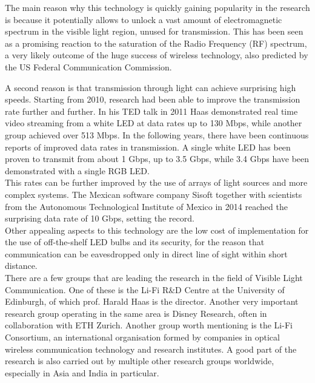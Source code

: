 The main reason why this technology is quickly gaining popularity in the research is because it potentially allows to unlock a vast amount of electromagnetic spectrum in the visible light region, unused for transmission.\cite{haas1}
This has been seen as a promising reaction to the saturation of the Radio Frequency (RF) spectrum, a very likely outcome of the huge success of wireless technology, also predicted by the US Federal Communication Commission\cite{crisis}. 

A second reason is that transmission through light can achieve surprising high speeds.
Starting from 2010, research had been able to improve the transmission rate further and further.
In his TED talk in 2011 Haas demonstrated real time video streaming from a white LED at data rates up to 130 Mbps\cite{tedtalk}, while another group achieved over 513 Mbps\cite{500Mbps}.
In the following years, there have been continuous reports of improved data rates in transmission.
A single white LED has been proven to transmit from about 1 Gbps\cite{1Gbps}, up to 3.5 Gbps\cite{3.5Gbps}, while 3.4 Gbps have been demonstrated with a single RGB LED\cite{3.4Gbps}.\\
This rates can be further improved by the use of arrays of light sources and more complex systems.
The Mexican software company Sisoft together with scientists from the Autonomous Technological
Institute of Mexico in 2014 reached the surprising data rate of 10 Gbps, setting the record.\\
Other appealing aspects to this technology are the low cost of implementation for the use of off-the-shelf LED bulbs and its security, for the reason that communication can be eavesdropped only in direct line of sight within short distance.\\
 
There are a few groups that are leading the research in the field of Visible Light Communication.
One of these is the Li-Fi R\&D Centre at the University of Edinburgh, of which prof. Harald Haas is the director.
Another very important research group operating in the same area is Disney Research, often in collaboration with ETH Zurich.
Another group worth mentioning is the Li-Fi Consortium, an international organisation formed by companies in optical wireless communication technology and research institutes.
A good part of the research is also carried out by multiple other research groups worldwide, especially in Asia and India in particular.

